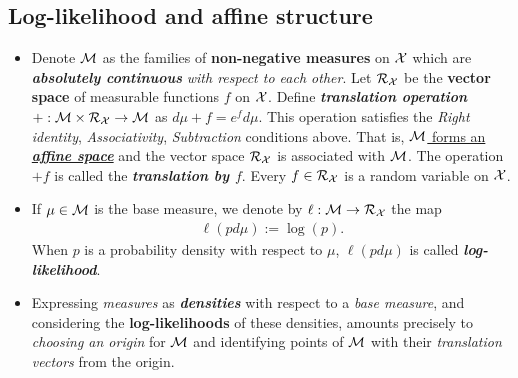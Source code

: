 \documentclass[11pt]{article}
\begin{document}
\subsection{Log-likelihood and affine structure}
\begin{itemize}
\item \begin{definition}
Denote ${\mathcal M}$ as  the families of \textbf{non-negative measures} on ${\mathcal X}$ which are \textbf{\emph{absolutely continuous}} \emph{with respect to each other}. %
Let ${\mathcal R}_{{\mathcal X}}$ be the \textbf{vector space} of measurable functions $f$ on ${\mathcal X}$. Define \emph{\textbf{translation operation}} $+: {\mathcal M} \times {\mathcal R}_{{\mathcal X}} \rightarrow {\mathcal M}$ as $d\mu + f  = e^{f}d\mu$.  This operation satisfies the \emph{Right identity}, \emph{Associativity}, \emph{Subtraction} conditions above. 
That is, \underline{${\mathcal M}$ forms an \textbf{\emph{affine space}}} and the vector space ${\mathcal R}_{{\mathcal X}}$ is associated with ${\mathcal M}$.  The operation  $+f$ is called the \emph{\textbf{translation by $f$}}.  Every $f\in {\mathcal R}_{{\mathcal X}}$ is a random variable on ${\mathcal X}$.
\end{definition} 

\item 
\begin{definition} If $\mu \in {\mathcal M}$ is the base measure, we denote by $\ell: {\mathcal M} \rightarrow {\mathcal R}_{{\mathcal X}}$ the map
\begin{align}
\ell(p d\mu) := \log(p).  \label{eqn: log_likelihood}
\end{align} When $p$ is a probability density with respect to $\mu$, $\ell(p d\mu)$ is called \emph{\textbf{log-likelihood}}.
\end{definition}

\item Expressing \emph{measures} as \emph{\textbf{densities}} with respect to a \emph{base measure}, and considering the \textbf{log-likelihoods} of these densities, amounts precisely to \emph{choosing an origin} for ${\mathcal M}$ and identifying points of ${\mathcal M}$ with their \emph{translation vectors} from the origin. %


\end{itemize}
\end{document}

